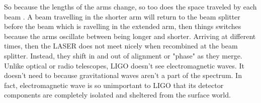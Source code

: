 So because the lengths of the arms change, so too does the space traveled by each beam . A beam travelling in the shorter arm will return to the beam splitter before the beam which is ravelling in the extended arm, then things switches because the arms oscillate between being longer and shorter. Arriving at different times, then the LASER does not meet nicely when recombined at the beam splitter. Instead, they shift in and out of alignment or "phase" as they merge. Unlike optical or radio telescopes, LIGO doesn't see electromagnetic waves. It doesn't need to because gravitational waves aren't a part of the spectrum. In fact, electromagnetic wave is so unimportant to LIGO that its detector components are completely isolated and sheltered from the surface world.

\pagebreak















































































\pagebreak
